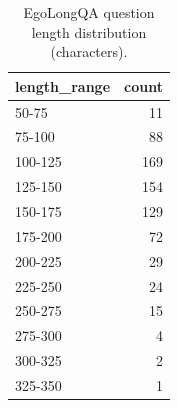 \begin{table}[t]
\centering
\small
\caption{EgoLongQA question length distribution (characters).}
\label{tab:qlen}
\begin{tabular}{lr}
\toprule
length\_range & count \\
\midrule
50-75 & 11 \\
75-100 & 88 \\
100-125 & 169 \\
125-150 & 154 \\
150-175 & 129 \\
175-200 & 72 \\
200-225 & 29 \\
225-250 & 24 \\
250-275 & 15 \\
275-300 & 4 \\
300-325 & 2 \\
325-350 & 1 \\
\bottomrule
\end{tabular}
\end{table}
